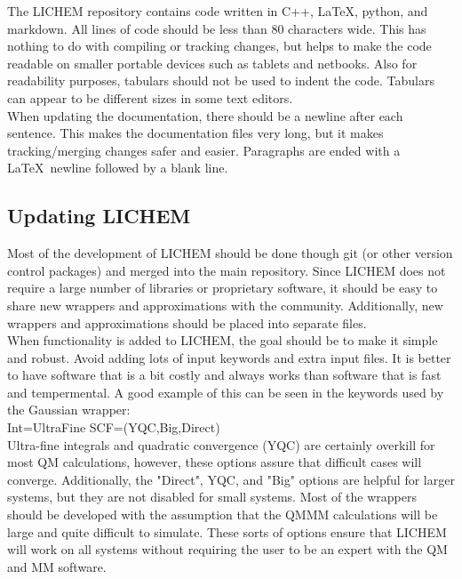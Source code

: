 \documentclass[12pt]{report}
\begin{document}
The LICHEM repository contains code written in C++, \LaTeX, python,
and markdown.
All lines of code should be less than 80 characters wide.
This has nothing to do with compiling or tracking changes, but helps to make
the code readable on smaller portable devices such as tablets and netbooks.
Also for readability purposes, tabulars should not be used to indent the code.
Tabulars can appear to be different sizes in some text editors. \\

When updating the documentation, there should be a newline after each
sentence.
This makes the documentation files very long, but it makes tracking/merging
changes safer and easier.
Paragraphs are ended with a \LaTeX\ newline followed by a blank line.

\subsection{Updating LICHEM}

Most of the development of LICHEM should be done though git (or other version
control packages) and merged into the main repository.
Since LICHEM does not require a large number of libraries or proprietary
software, it should be easy to share new wrappers and approximations with the
community.
Additionally, new wrappers and approximations should be placed into separate
files. \\

When functionality is added to LICHEM, the goal should be to make it simple
and robust.
Avoid adding lots of input keywords and extra input files.
It is better to have software that is a bit costly and always works than
software that is fast and tempermental.
A good example of this can be seen in the keywords used by the Gaussian
wrapper: \\

Int=UltraFine SCF=(YQC,Big,Direct) \\

Ultra-fine integrals and quadratic convergence (YQC) are certainly overkill
for most QM calculations, however, these options assure that difficult cases
will converge.
Additionally, the "Direct", YQC, and "Big" options are helpful for
larger systems, but they are not disabled for small systems.
Most of the wrappers should be developed with the assumption that the QMMM
calculations will be large and quite difficult to simulate.
These sorts of options ensure that LICHEM will work on all systems without
requiring the user to be an expert with the QM and MM software. \\
\end{document}
